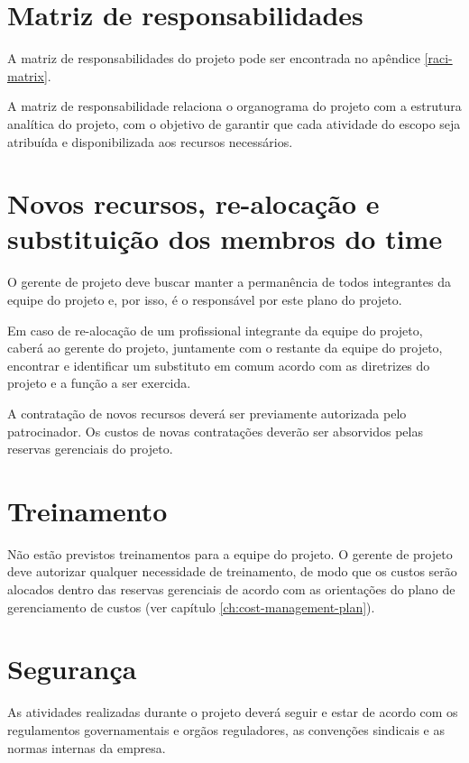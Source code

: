 \section{Matriz de responsabilidades}

A matriz de responsabilidades do projeto pode ser encontrada no apêndice \ref{raci-matrix}.

A matriz de responsabilidade relaciona o organograma do projeto com a estrutura analítica do projeto, com o objetivo de garantir que cada atividade do escopo seja atribuída e disponibilizada aos recursos necessários.

\section{Novos recursos, re-alocação e substituição dos membros do time}

O gerente de projeto deve buscar manter a permanência de todos integrantes da equipe do projeto e, por isso, é o responsável por este plano do projeto.

Em caso de re-alocação de um profissional integrante da equipe do projeto, caberá ao gerente do projeto, juntamente com o restante da equipe do projeto, encontrar e identificar um substituto em comum acordo com as diretrizes do projeto e a função a ser exercida. 

A contratação de novos recursos deverá ser previamente autorizada pelo patrocinador. Os custos de novas contratações deverão ser absorvidos pelas reservas gerenciais do projeto.

\section{Treinamento}

Não estão previstos treinamentos para a equipe do projeto. O gerente de projeto deve autorizar qualquer necessidade de treinamento, de modo que os custos serão alocados dentro das reservas gerenciais de acordo com as orientações do plano de gerenciamento de custos (ver capítulo \ref{ch:cost-management-plan}).

\section{Segurança}

As atividades realizadas durante o projeto deverá seguir e estar de acordo com os regulamentos governamentais e orgãos reguladores, as convenções sindicais e as normas internas da empresa.

